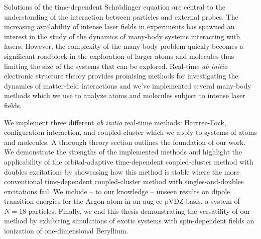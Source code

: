 Solutions of the time-dependent Schrödinger equation are central to the
understanding of the interaction between particles and external probes.
The increasing availability of intense laser fields in experiments has spawned
an interest in the study of the dynamics of many-body systems interacting with
lasers.
However, the complexity of the many-body problem quickly becomes a significant
roadblock in the exploration of larger atoms and molecules thus limiting the
size of the systems that can be explored.
Real-time \textit{ab initio} electronic structure theory provides promising
methods for investigating the dynamics of matter-field interactions and we've
implemented several many-body methods which we use to analyze atoms and
molecules subject to intense laser fields.

We implement three different \emph{ab initio} real-time methods: Hartree-Fock,
configuration interaction, and coupled-cluster which we apply to systems of
atoms and molecules.
A thorough theory section outlines the foundation of our work.
We demonstrate the strengths of the implemented methods and highlight the
applicability of the orbital-adaptive time-dependent coupled-cluster method with
doubles excitations by showcasing how this method is stable where the more
conventional time-dependent coupled-cluster method with singles-and-doubles
excitations fail.
We include -- to our knowledge -- unseen results on dipole transition energies
for the Argon atom in an aug-cc-pVDZ basis, a system of $N = 18$ particles.
Finally, we end this thesis demonstrating the versatility of our method by
exhibiting simulations of exotic systems with spin-dependent fields an
ionization of one-dimensional Beryllium.
